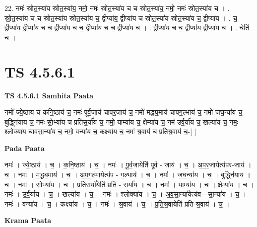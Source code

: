 \documentclass[17pt]{extarticle}
\begin{document}
22. नमः॑ स्रोत॒स्या॑य स्रोत॒स्या॑य॒ नमो॒ नमः॑ स्रोत॒स्या॑य च च स्रोत॒स्या॑य॒ नमो॒ नमः॑ स्रोत॒स्या॑य च । . स्रो॒त॒स्या॑य च च स्रोत॒स्या॑य स्रोत॒स्या॑य च॒ द्वीप्या॑य॒ द्वीप्या॑य च स्रोत॒स्या॑य स्रोत॒स्या॑य च॒ द्वीप्या॑य । . च॒ द्वीप्या॑य॒ द्वीप्या॑य च च॒ द्वीप्या॑य च च॒ द्वीप्या॑य च च॒ द्वीप्या॑य च । . द्वीप्या॑य च च॒ द्वीप्या॑य॒ द्वीप्या॑य च । . चेति॑ च । \newline
\pagebreak
{}

\section{ TS 4.5.6.1 }

\textbf{TS 4.5.6.1 } \newline
\textbf{Samhita Paata} \newline

नमो᳚ ज्ये॒ष्ठाय॑ च कनि॒ष्ठाय॑ च॒ नमः॑ पूर्व॒जाय॑ चापर॒जाय॑ च॒ नमो॑ मद्ध्य॒माय॑ चापग॒ल्भाय॑ च॒ नमो॑ जघ॒न्या॑य च॒ बुद्ध्नि॑याय च॒ नमः॑ सो॒भ्या॑य च प्रतिस॒र्या॑य च॒ नमो॒ याम्या॑य च॒ क्षेम्या॑य च॒ नम॑ उर्व॒र्या॑य च॒ खल्या॑य च॒ नमः॒ श्लोक्या॑य चावसा॒न्या॑य च॒ नमो॒ वन्या॑य च॒ कक्ष्या॑य च॒ नमः॑ श्र॒वाय॑ च प्रतिश्र॒वाय॑ च॒-[  ] \newline

\textbf{Pada Paata} \newline

नमः॑ । ज्ये॒ष्ठाय॑ । च॒ । क॒नि॒ष्ठाय॑ । च॒ । नमः॑ । पू॒र्व॒जायेति॑ पूर्व - जाय॑ । च॒ । अ॒प॒र॒जायेत्य॑पर-जाय॑ । च॒ । नमः॑ । म॒द्ध्य॒माय॑ । च॒ । अ॒प॒ग॒ल्भायेत्य॑प - ग॒ल्भाय॑ । च॒ । नमः॑ । ज॒घ॒न्या॑य । च॒ । बुद्ध्नि॑याय । च॒ । नमः॑ । सो॒भ्या॑य । च॒ । प्र॒ति॒स॒र्या॑येति॑ प्रति - स॒र्या॑य । च॒ । नमः॑ । याम्या॑य । च॒ । क्षेम्या॑य । च॒ । नमः॑ । उ॒र्व॒र्या॑य । च॒ । खल्या॑य । च॒ । नमः॑ । श्लोक्या॑य । च॒ । अ॒व॒सा॒न्या॑येत्य॑व - सा॒न्या॑य । च॒ । नमः॑ । वन्या॑य । च॒ । कक्ष्या॑य । च॒ । नमः॑ । श्र॒वाय॑ । च॒ । प्र॒ति॒श्र॒वायेति॑ प्रति-श्र॒वाय॑ । च॒ ।  \newline


\textbf{Krama Paata} \newline
\end{document}
